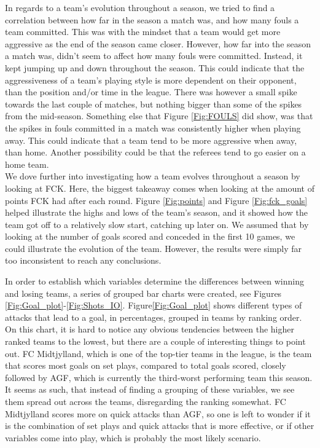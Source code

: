 \documentclass[Report.tex]{subfiles}
\begin{document}
In regards to a team's evolution throughout a season, we tried to find a correlation between how far in the season a match was, and how many fouls a team committed.
This was with the mindset that a team would get more aggressive as the end of the season came closer. However, how far into the season a match was, didn't seem to affect how many fouls were committed. Instead, it kept jumping up and down throughout the season. This could indicate that the aggressiveness of a team's playing style is more dependent on their opponent, than the position and/or time in the league. There was however a small spike towards the last couple of matches, but nothing bigger than some of the spikes from the mid-season. Something else that Figure \ref{Fig:FOULS} did show, was that the spikes in fouls committed in a match was consistently higher when playing away. This could indicate that a team tend to be more aggressive when away, than home. Another possibility could be that the referees tend to go easier on a home team.
\\

We dove further into investigating how a team evolves throughout a season by looking at FCK. Here, the biggest takeaway comes when looking at the amount of points FCK had after each round. Figure \ref{Fig:points} and Figure \ref{Fig:fck_goals} helped illustrate the highs and lows of the team’s season, and it showed how the team got off to a relatively slow start, catching up later on. We assumed that by looking at the number of goals scored and conceded in the first 10 games, we could illustrate the evolution of the team. However, the results were simply far too inconsistent to reach any conclusions. 

In order to establish which variables determine the differences between
winning and losing teams, a series of grouped bar charts were created, see
Figures \ref{Fig:Goal_plot}-\ref{Fig:Shots_IO}. Figure\ref{Fig:Goal_plot} shows different types of attacks that lead to a goal,
in percentages, grouped in teams by ranking order.
On this chart, it is hard to notice any obvious tendencies between the higher
ranked teams to the lowest, but there are a couple of interesting things to
point out. FC Midtjylland, which is one of the top-tier teams in the league, is
the team that scores most goals on set plays, compared to total goals scored,
closely followed by AGF, which is currently the third-worst performing team
this season. It seems as such, that instead of finding a grouping of these
variables, we see them spread out across the teams, disregarding the ranking
somewhat. FC Midtjylland scores more on quick attacks than AGF, so one is left
to wonder if it is the combination of set plays and quick attacks that is more
effective, or if other variables come into play, which is probably the most
likely scenario.
\end{document}
